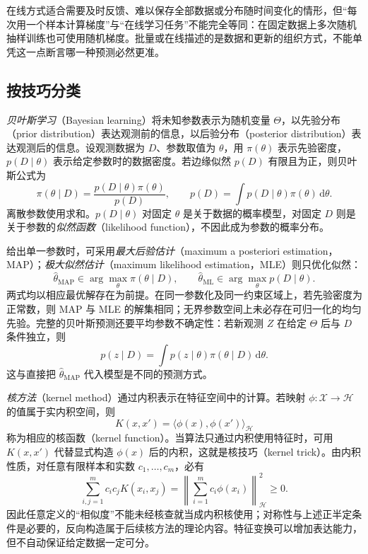 在线方式适合需要及时反馈、难以保存全部数据或分布随时间变化的情形，但“每次用一个样本计算梯度”与“在线学习任务”不能完全等同：在固定数据上多次随机抽样训练也可使用随机梯度。批量或在线描述的是数据和更新的组织方式，不能单凭这一点断言哪一种预测必然更准。

\subsection{按技巧分类}
\label{subsec:lh-technique-categories}

\emph{贝叶斯学习}（Bayesian learning）将未知参数表示为随机变量 $\Theta$，以先验分布（prior distribution）表达观测前的信息，以后验分布（posterior distribution）表达观测后的信息。设观测数据为 $D$、参数取值为 $\theta$，用 $\pi(\theta)$ 表示先验密度，$p(D\mid\theta)$ 表示给定参数时的数据密度。若边缘似然 $p(D)$ 有限且为正，则贝叶斯公式为
\begin{equation}
    \pi(\theta\mid D)
    =\frac{p(D\mid\theta)\pi(\theta)}{p(D)},
    \qquad
    p(D)=\int p(D\mid\theta)\pi(\theta)\,\mathrm d\theta.
    \label{eq:lh-bayes-posterior}
\end{equation}
离散参数使用求和。$p(D\mid\theta)$ 对固定 $\theta$ 是关于数据的概率模型，对固定 $D$ 则是关于参数的\emph{似然函数}（likelihood function），不因此成为参数的概率分布。

给出单一参数时，可采用\emph{最大后验估计}（maximum a posteriori estimation，MAP）；\emph{极大似然估计}（maximum likelihood estimation，MLE）则只优化似然：
\[
    \widehat\theta_{\mathrm{MAP}}\in
      \arg\max_{\theta}\pi(\theta\mid D),
    \qquad
    \widehat\theta_{\mathrm{ML}}\in
      \arg\max_{\theta}p(D\mid\theta).
\]
两式均以相应最优解存在为前提。在同一参数化及同一约束区域上，若先验密度为正常数，则 MAP 与 MLE 的解集相同；无界参数空间上未必存在可归一化的均匀先验。完整的贝叶斯预测还要平均参数不确定性：若新观测 $Z$ 在给定 $\Theta$ 后与 $D$ 条件独立，则
\begin{equation}
    p(z\mid D)=\int p(z\mid\theta)\pi(\theta\mid D)\,\mathrm d\theta.
    \label{eq:lh-posterior-predictive}
\end{equation}
这与直接把 $\widehat\theta_{\mathrm{MAP}}$ 代入模型是不同的预测方式。

\emph{核方法}（kernel method）通过内积表示在特征空间中的计算。若映射 $\phi:\mathcal X\to\mathcal H$ 的值属于实内积空间，则
\begin{equation}
    K(x,x')=\langle\phi(x),\phi(x')\rangle_{\mathcal H}
    \label{eq:lh-kernel-inner-product}
\end{equation}
称为相应的核函数（kernel function）。当算法只通过内积使用特征时，可用 $K(x,x')$ 代替显式构造 $\phi(x)$ 后的内积，这就是核技巧（kernel trick）。由内积性质，对任意有限样本和实数 $c_1,\ldots,c_m$，必有
\[
    \sum_{i,j=1}^m c_ic_jK(x_i,x_j)
    =\left\|\sum_{i=1}^m c_i\phi(x_i)\right\|_{\mathcal H}^2\geq0.
\]
因此任意定义的“相似度”不能未经核查就当成内积核使用；对称性与上述正半定条件是必要的，反向构造属于后续核方法的理论内容。特征变换可以增加表达能力，但不自动保证给定数据一定可分。


